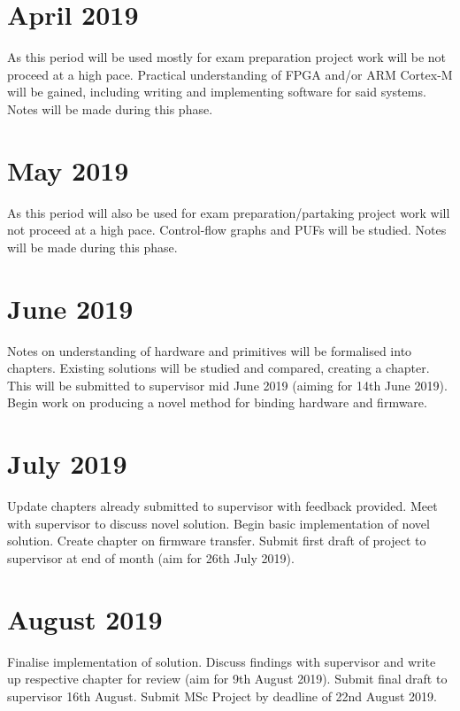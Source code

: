 \documentclass[10pt]{report}
\begin{document}
\section*{April 2019}
As this period will be used mostly for exam preparation project work will be not proceed at a high pace. Practical understanding of FPGA and/or ARM Cortex-M will be gained, including writing and implementing software for said systems. Notes will be made during this phase.

\section*{May 2019}
As this period will also be used for exam preparation/partaking project work will not proceed at a high pace. Control-flow graphs and PUFs will be studied. Notes will be made during this phase.

\section*{June 2019}
Notes on understanding of hardware and primitives will be formalised into chapters. Existing solutions will be studied and compared, creating a chapter. This will be submitted to supervisor mid June 2019 (aiming for 14th June 2019).
Begin work on producing a novel method for binding hardware and firmware.

\section*{July 2019}
Update chapters already submitted to supervisor with feedback provided. Meet with supervisor to discuss novel solution. Begin basic implementation of novel solution. Create chapter on firmware transfer. Submit first draft of project to supervisor at end of month (aim for 26th July 2019).

\section*{August 2019}
Finalise implementation of solution. Discuss findings with supervisor and write up respective chapter for review (aim for 9th August 2019). Submit final draft to supervisor 16th August. Submit MSc Project by deadline of 22nd August 2019.
\end{document}
